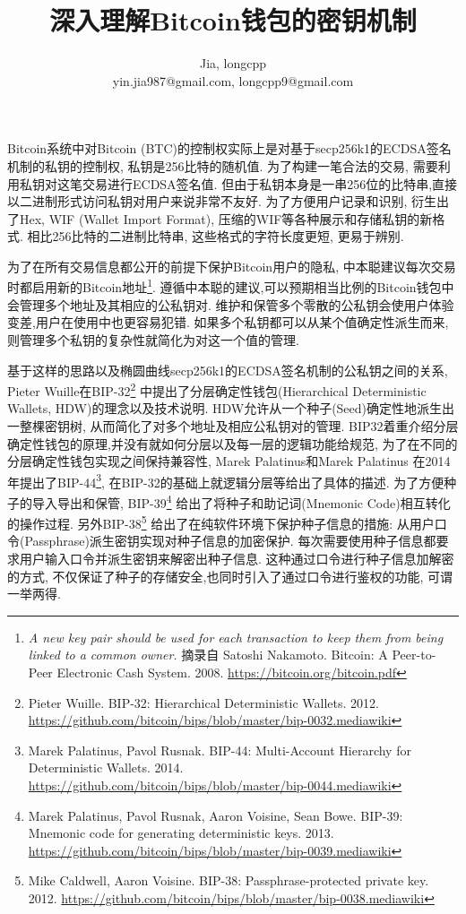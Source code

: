 \documentclass{article}
\begin{document}
\title{深入理解Bitcoin钱包的密钥机制}
\author{Jia, longcpp \\ \small{yin.jia987@gmail.com, longcpp9@gmail.com}}

\maketitle

Bitcoin系统中对Bitcoin (BTC)的控制权实际上是对基于secp256k1的ECDSA签名机制的私钥的控制权,
私钥是256比特的随机值. 为了构建一笔合法的交易, 需要利用私钥对这笔交易进行ECDSA签名值.
但由于私钥本身是一串256位的比特串,直接以二进制形式访问私钥对用户来说非常不友好.
为了方便用户记录和识别, 衍生出了Hex, WIF (Wallet Import Format), 压缩的WIF等各种展示和存储私钥的新格式.
相比256比特的二进制比特串, 这些格式的字符长度更短, 更易于辨别. 

为了在所有交易信息都公开的前提下保护Bitcoin用户的隐私,
中本聪建议每次交易时都启用新的Bitcoin地址\footnote{
\textit{A new key pair should be used for each transaction to keep them from being linked to a common owner.}
摘录自 Satoshi Nakamoto. Bitcoin: A Peer-to-Peer Electronic Cash System. 2008. 
\url{https://bitcoin.org/bitcoin.pdf}}.
遵循中本聪的建议,可以预期相当比例的Bitcoin钱包中会管理多个地址及其相应的公私钥对.
维护和保管多个零散的公私钥会使用户体验变差,用户在使用中也更容易犯错.
如果多个私钥都可以从某个值确定性派生而来,则管理多个私钥的复杂性就简化为对这一个值的管理.

基于这样的思路以及椭圆曲线secp256k1的ECDSA签名机制的公私钥之间的关系,
Pieter Wuille在BIP-32\footnote{
Pieter Wuille. BIP-32: Hierarchical Deterministic Wallets. 2012. 
\url{https://github.com/bitcoin/bips/blob/master/bip-0032.mediawiki}}
中提出了分层确定性钱包(Hierarchical Deterministic Wallets, HDW)的理念以及技术说明.
HDW允许从一个种子(Seed)确定性地派生出一整棵密钥树, 从而简化了对多个地址及相应公私钥对的管理.
BIP32着重介绍分层确定性钱包的原理,并没有就如何分层以及每一层的逻辑功能给规范,
为了在不同的分层确定性钱包实现之间保持兼容性, Marek Palatinus和Marek Palatinus
在2014年提出了BIP-44\footnote{
Marek Palatinus, Pavol Rusnak. BIP-44: Multi-Account Hierarchy for Deterministic Wallets. 2014.
\url{https://github.com/bitcoin/bips/blob/master/bip-0044.mediawiki}},
在BIP-32的基础上就逻辑分层等给出了具体的描述.
为了方便种子的导入导出和保管, 
BIP-39\footnote{Marek Palatinus, Pavol Rusnak, Aaron Voisine, Sean Bowe. 
BIP-39: Mnemonic code for generating deterministic keys. 2013.
\url{https://github.com/bitcoin/bips/blob/master/bip-0039.mediawiki}}
给出了将种子和助记词(Mnemonic Code)相互转化的操作过程.
另外BIP-38\footnote{Mike Caldwell, Aaron Voisine. BIP-38: Passphrase-protected private key. 2012.
\url{https://github.com/bitcoin/bips/blob/master/bip-0038.mediawiki}}
给出了在纯软件环境下保护种子信息的措施: 从用户口令(Passphrase)派生密钥实现对种子信息的加密保护.
每次需要使用种子信息都要求用户输入口令并派生密钥来解密出种子信息.
这种通过口令进行种子信息加解密的方式,
不仅保证了种子的存储安全,也同时引入了通过口令进行鉴权的功能, 可谓一举两得.
\end{document}
